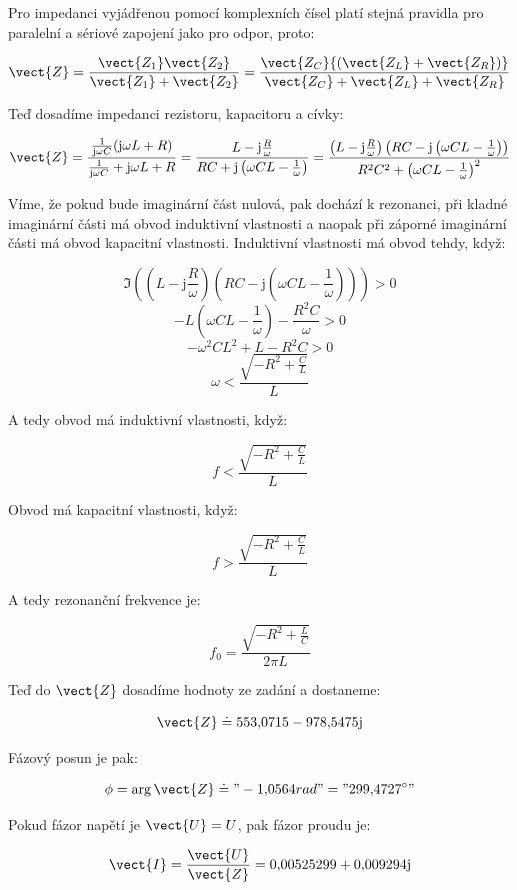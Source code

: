 \documentclass{fkssolpub}
\author{Ondřej Sedláček}
\renewcommand{\j}{\mathrm{j}}
\begin{document}
Pro impedanci vyjádřenou pomocí komplexních čísel platí stejná pravidla pro paralelní a sériové zapojení jako pro odpor, proto:

\[
	\vect{Z}= \frac{\vect{Z_1} \vect{Z_2}}{\vect{Z_1} + \vect{Z_2}} = \frac{\vect{Z_C} {\left(\vect{Z_L} + \vect{Z_{R}}\right)}}{\vect{Z_C} + \vect{Z_L} + \vect{Z_R}}
\]

Teď dosadíme impedanci rezistoru, kapacitoru a cívky:

\[
	\vect{Z}= \frac{\frac{1}{\j \omega C} {\left(\j \omega L + R\right)}}{\frac{1}{\j \omega C} + \j \omega L + R} = \frac{L - \j \frac{R}{\omega}}{R C + \j \left( \omega C L - \frac{1}{\omega} \right)} = \frac{\left(L - \j \frac{R}{\omega}\right)\left(R C - \j \left( \omega C L - \frac{1}{\omega} \right)\right)}{R^2 C^2 + \left( \omega C L - \frac{1}{\omega} \right)^2}
\]

Víme, že pokud bude imaginární část nulová, pak dochází k rezonanci, při kladné imaginární části má obvod induktivní vlastnosti a naopak při záporné imaginární části má obvod kapacitní vlastnosti. Induktivní vlastnosti má obvod tehdy, když:

\[
	\Im \left(\left(L - \j \frac{R}{\omega}\right)\left(R C - \j \left( \omega C L - \frac{1}{\omega} \right)\right)\right) > 0
\]
\[
	- L \left( \omega C L - \frac{1}{\omega} \right) - \frac{R^2 C}{\omega} > 0
\]
\[
	- \omega^2 C L^2 + L - R^2 C > 0
\]
\[
	\omega < \frac{\sqrt{-R^2 + \frac{C}{L}}}{L}
\]

A tedy obvod má induktivní vlastnosti, když:

\[
	f < \frac{\sqrt{-R^2 + \frac{C}{L}}}{L}
\]

Obvod má kapacitní vlastnosti, když:

\[
	f > \frac{\sqrt{-R^2 + \frac{C}{L}}}{L}
\]

A tedy rezonanční frekvence je:

\[
	f_0 = \frac{\sqrt{-R^{2} + \frac{L}{C}}}{2 \pi L}
\]

Teď do $\vect{Z}$ dosadíme hodnoty ze zadání a dostaneme:

\[
	\vect{Z} \doteq 553{,}0715 - 978{,}5475\j
\]

Fázový posun je pak:

\[
	\phi = \arg \vect{Z} \doteq "-1{,}0564 rad" = "299{,}4727^{\circ}"
\]

Pokud fázor napětí je $\vect{U} = U$, pak fázor proudu je:

\[
	\vect{I} = \frac{\vect{U}}{\vect{Z}} = 0{,}00525299 + 0{,}009294 \j
\]
\end{document}
